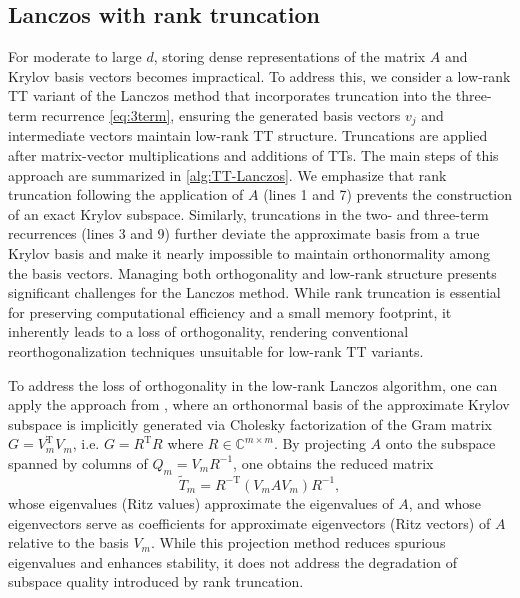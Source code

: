 \documentclass[10pt,preprint]{elsarticle}
\renewcommand{\top}{\text{T}}
\begin{document}
\begin{appendices}
\subsection{Lanczos with rank truncation}
\label{sec:lanczos_lr}

For moderate to large $d$, storing dense representations of the matrix $A$ and Krylov basis vectors becomes impractical. To address this, we consider a low-rank TT variant of the Lanczos method that incorporates truncation into the three-term recurrence \eqref{eq:3term}, ensuring the generated basis vectors $v_j$ and intermediate vectors maintain low-rank TT structure. Truncations are applied after matrix-vector multiplications and additions of TTs. The main steps of this approach are summarized in \cref{alg:TT-Lanczos}. We emphasize that rank truncation following the application of $A$ (lines 1 and 7) prevents the construction of an exact Krylov subspace. Similarly, truncations in the two- and three-term recurrences (lines 3 and 9) further deviate the approximate basis from a true Krylov basis and make it nearly impossible to maintain orthonormality among the basis vectors. Managing both orthogonality and low-rank structure presents significant challenges for the Lanczos method. While rank truncation is essential for preserving computational efficiency and a small memory footprint, it inherently leads to a loss of orthogonality, rendering conventional reorthogonalization techniques unsuitable for low-rank TT variants. 

To address the loss of orthogonality in the low-rank Lanczos algorithm, one can apply the approach from \cite{MPS_Lanczos}, where an orthonormal basis of the approximate Krylov subspace is implicitly generated via Cholesky factorization of the Gram matrix $G = V_m^{\top} V_m$, i.e. $G = R^{\top} R$ where $R \in \mathbb{C}^{m \times m}$. By projecting $A$ onto the subspace spanned by columns of $Q_m = V_mR^{-1}$, one obtains the reduced matrix 
\begin{equation} \label{eq:lanczos_reduced_mat}
\tilde{T}_m = R^{-\top}\left( V_m A V_m \right) R^{-1}, 
\end{equation} 
whose eigenvalues (Ritz values) approximate the eigenvalues of $A$, and whose eigenvectors serve as coefficients for approximate eigenvectors (Ritz vectors) of $A$ relative to the basis $V_m$. While this projection method reduces spurious eigenvalues and enhances stability, it does not address the degradation of subspace quality introduced by rank truncation. 


\end{appendices}
\end{document}
